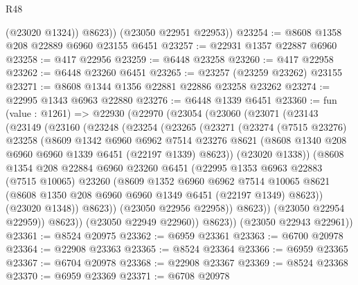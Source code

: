 \begin{lexlean}{R48}
\begin{coremodule}
            (@23020 @1324))
          @8623))
      (@23050 @22951 @22953))
@23254 := @8608 @1358 @208 @22889 @6960 @23155 @6451
@23257 := @22931 @1357 @22887 @6960
@23258 := @417 @22956
@23259 := @6448 @23258
@23260 := @417 @22958
@23262 := @6448 @23260 @6451
@23265 := @23257 (@23259 @23262) @23155
@23271 := @8608 @1344 @1356 @22881 @22886 @23258 @23262
@23274 := @22995 @1343 @6963 @22880
@23276 := @6448 @1339 @6451
@23360 := fun (value : @1261) =>
  @22930
    (@22970
      (@23054
        (@23060
          (@23071
            (@23143
              (@23149
                (@23160
                  (@23248
                    (@23254
                      (@23265
                        (@23271
                          (@23274
                            (@7515 @23276)
                            @23258
                            (@8609
                              @1342
                              @6960
                              @6962
                              @7514
                              @23276
                              @8621
                              (@8608 @1340 @208 @6960 @6960 @1339 @6451 (@22197 @1339) @8623))
                            (@23020 @1338))
                          (@8608
                            @1354
                            @208
                            @22884
                            @6960
                            @23260
                            @6451
                            (@22995
                              @1353
                              @6963
                              @22883
                              (@7515 @10065)
                              @23260
                              (@8609
                                @1352
                                @6960
                                @6962
                                @7514
                                @10065
                                @8621
                                (@8608 @1350 @208 @6960 @6960 @1349 @6451 (@22197 @1349) @8623))
                              (@23020 @1348))
                            @8623))
                        (@23050 @22956 @22958))
                      @8623))
                  (@23050 @22954 @22959))
                @8623))
            (@23050 @22949 @22960))
          @8623))
      (@23050 @22943 @22961))
@23361 := @8524 @20975
@23362 := @6959 @23361
@23363 := @6700 @20978
@23364 := @22908 @23363
@23365 := @8524 @23364
@23366 := @6959 @23365
@23367 := @6704 @20978
@23368 := @22908 @23367
@23369 := @8524 @23368
@23370 := @6959 @23369
@23371 := @6708 @20978

\end{coremodule}
\end{lexlean}
